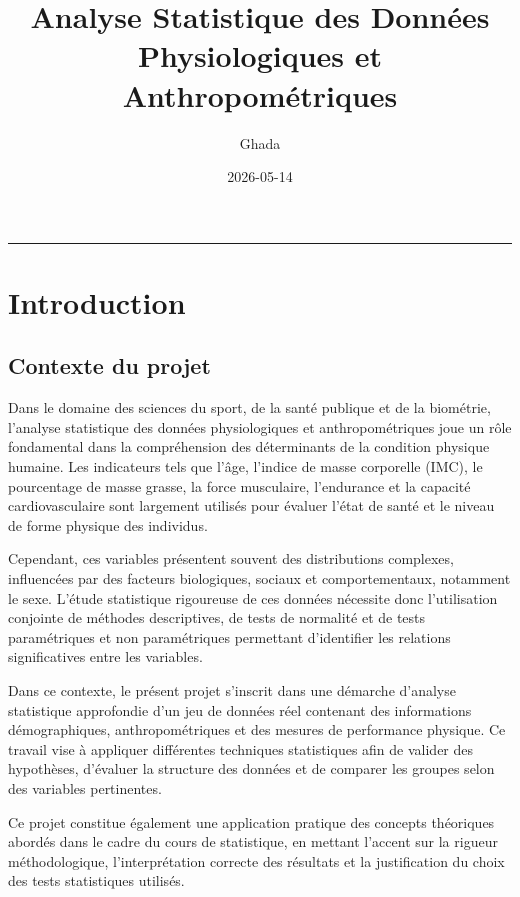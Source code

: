 \documentclass[
]{article}
\title{Analyse Statistique des Données Physiologiques et
Anthropométriques}
\author{Ghada}
\date{2026-05-14}
\begin{document}
\maketitle

{
\setcounter{tocdepth}{3}
\tableofcontents
}
\begin{center}\rule{0.5\linewidth}{0.5pt}\end{center}

\section{Introduction}\label{introduction}

\subsection{Contexte du projet}\label{contexte-du-projet}

Dans le domaine des sciences du sport, de la santé publique et de la
biométrie, l'analyse statistique des données physiologiques et
anthropométriques joue un rôle fondamental dans la compréhension des
déterminants de la condition physique humaine. Les indicateurs tels que
l'âge, l'indice de masse corporelle (IMC), le pourcentage de masse
grasse, la force musculaire, l'endurance et la capacité cardiovasculaire
sont largement utilisés pour évaluer l'état de santé et le niveau de
forme physique des individus.

Cependant, ces variables présentent souvent des distributions complexes,
influencées par des facteurs biologiques, sociaux et comportementaux,
notamment le sexe. L'étude statistique rigoureuse de ces données
nécessite donc l'utilisation conjointe de méthodes descriptives, de
tests de normalité et de tests paramétriques et non paramétriques
permettant d'identifier les relations significatives entre les
variables.

Dans ce contexte, le présent projet s'inscrit dans une démarche
d'analyse statistique approfondie d'un jeu de données réel contenant des
informations démographiques, anthropométriques et des mesures de
performance physique. Ce travail vise à appliquer différentes techniques
statistiques afin de valider des hypothèses, d'évaluer la structure des
données et de comparer les groupes selon des variables pertinentes.

Ce projet constitue également une application pratique des concepts
théoriques abordés dans le cadre du cours de statistique, en mettant
l'accent sur la rigueur méthodologique, l'interprétation correcte des
résultats et la justification du choix des tests statistiques utilisés.
\end{document}
